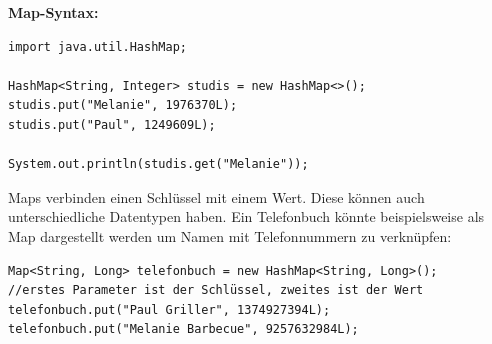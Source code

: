 \documentclass{../../sheet}
\begin{document}
\textbf{Map-Syntax:}

\begin{verbatim}
import java.util.HashMap;

HashMap<String, Integer> studis = new HashMap<>();
studis.put("Melanie", 1976370L);
studis.put("Paul", 1249609L);

System.out.println(studis.get("Melanie"));
	\end{verbatim}


\newpage
{}
Maps verbinden einen Schlüssel mit einem Wert. Diese können auch unterschiedliche Datentypen haben. Ein Telefonbuch könnte beispielsweise als Map dargestellt werden um Namen mit Telefonnummern zu verknüpfen:
\begin{verbatim}
Map<String, Long> telefonbuch = new HashMap<String, Long>();
//erstes Parameter ist der Schlüssel, zweites ist der Wert
telefonbuch.put("Paul Griller", 1374927394L);
telefonbuch.put("Melanie Barbecue", 9257632984L);
\end{verbatim}
\end{document}
